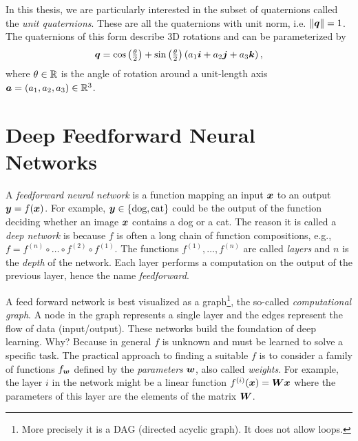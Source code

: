 		In this thesis, we are particularly interested in the subset of quaternions called the \emph{unit quaternions}. These are all the quaternions with unit norm, i.e. $\lVert \bm{q} \rVert = 1$. 
		The quaternions of this form describe 3D rotations and can be parameterized by
		\begin{equation}
			\bm{q} = 
			\cos\left(\tfrac{\theta}{2}\right) + 
			\sin\left(\tfrac{\theta}{2}\right) \left(a_1 \bm{i} + a_2 \bm{j} + a_3 \bm{k}\right),
		\end{equation}
		where $\theta \in \mathbb{R}$ is the angle of rotation around a unit-length axis $\bm{a} = (a_1, a_2, a_3) \in \mathbb{R}^3$.
	
	\section{Deep Feedforward Neural Networks}
		A \emph{feedforward neural network} is a function mapping an input $\bm{x}$ to an output $\bm{y} = f(\bm{x})$.
		For example, $\bm{y} \in \{\text{dog}, \text{cat} \}$ could be the output of the function deciding whether an image $\bm{x}$ contains a dog or a cat. 
		The reason it is called a \emph{deep network} is because $f$ is often a long chain of function compositions, e.g., 
		$f = f^{(n)} \circ  \ldots  \circ f^{(2)} \circ f^{(1)}$.
		The functions $f^{(1)}, \dots, f^{(n)}$ are called \emph{layers} and $n$ is the \emph{depth} of the network.
		Each layer performs a computation on the output of the previous layer, hence the name \emph{feedforward}.
		
		A feed forward network is best visualized as a graph\footnote{More precisely it is a DAG (directed acyclic graph). It does not allow loops.}, the so-called \emph{computational graph}.
		A node in the graph represents a single layer and the edges represent the flow of data (input/output).
		These networks build the foundation of deep learning.
		Why?
		Because in general $f$ is unknown and must be learned to solve a specific task.
		The practical approach to finding a suitable $f$ is to consider a family of functions $f_{\bm{w}}$ defined by the \emph{parameters} $\bm{w}$, also called \emph{weights}.
		For example, the layer $i$ in the network might be a linear function $f_{}^{(i)}(\bm{x}) = \bm{W} \bm{x}$ where the parameters of this layer are the elements of the matrix $\bm{W}$.
		
